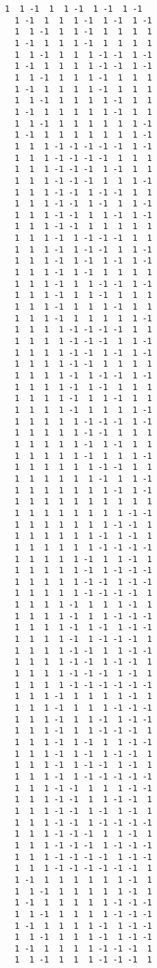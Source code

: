 \documentclass[%
 showpacs,
 showkeys,
 preprintnumbers,
 amsmath,amssymb,
 aps,
  pra,
  longbibliography,
 floatfix,
 ]{revtex4-1}
\begin{document}
{\begin{lstlisting}[backgroundcolor=\color{yellow!10},framerule=0pt,breaklines=true, frame=tb]
  1  1 -1  1  1 -1  1 -1  1 -1
  1 -1  1  1  1 -1  1 -1  1 -1
  1  1 -1  1  1 -1  1  1  1  1
  1 -1  1  1  1 -1  1  1  1  1
  1  1 -1  1  1  1 -1 -1  1 -1
  1 -1  1  1  1  1 -1 -1  1 -1
  1  1 -1  1  1  1 -1  1  1  1
  1 -1  1  1  1  1 -1  1  1  1
  1  1 -1  1  1  1  1 -1  1  1
  1 -1  1  1  1  1  1 -1  1  1
  1  1 -1  1  1  1  1  1  1 -1
  1 -1  1  1  1  1  1  1  1 -1
  1  1  1 -1 -1 -1 -1 -1  1 -1
  1  1  1 -1 -1 -1 -1  1  1  1
  1  1  1 -1 -1 -1  1 -1  1  1
  1  1  1 -1 -1 -1  1  1  1 -1
  1  1  1 -1 -1  1 -1 -1  1  1
  1  1  1 -1 -1  1 -1  1  1 -1
  1  1  1 -1 -1  1  1 -1  1 -1
  1  1  1 -1 -1  1  1  1  1  1
  1  1  1 -1  1 -1 -1 -1  1  1
  1  1  1 -1  1 -1 -1  1  1 -1
  1  1  1 -1  1 -1  1 -1  1 -1
  1  1  1 -1  1 -1  1  1  1  1
  1  1  1 -1  1  1 -1 -1  1 -1
  1  1  1 -1  1  1 -1  1  1  1
  1  1  1 -1  1  1  1 -1  1  1
  1  1  1 -1  1  1  1  1  1 -1
  1  1  1  1 -1 -1 -1 -1  1  1
  1  1  1  1 -1 -1 -1  1  1 -1
  1  1  1  1 -1 -1  1 -1  1 -1
  1  1  1  1 -1 -1  1  1  1  1
  1  1  1  1 -1  1 -1 -1  1 -1
  1  1  1  1 -1  1 -1  1  1  1
  1  1  1  1 -1  1  1 -1  1  1
  1  1  1  1 -1  1  1  1  1 -1
  1  1  1  1  1 -1 -1 -1  1 -1
  1  1  1  1  1 -1 -1  1  1  1
  1  1  1  1  1 -1  1 -1  1  1
  1  1  1  1  1 -1  1  1  1 -1
  1  1  1  1  1  1 -1 -1  1  1
  1  1  1  1  1  1 -1  1  1 -1
  1  1  1  1  1  1  1 -1  1 -1
  1  1  1  1  1  1  1  1  1  1
  1  1  1  1  1  1  1  1 -1 -1
  1  1  1  1  1  1  1 -1 -1  1
  1  1  1  1  1  1 -1  1 -1  1
  1  1  1  1  1  1 -1 -1 -1 -1
  1  1  1  1  1 -1  1  1 -1  1
  1  1  1  1  1 -1  1 -1 -1 -1
  1  1  1  1  1 -1 -1  1 -1 -1
  1  1  1  1  1 -1 -1 -1 -1  1
  1  1  1  1 -1  1  1  1 -1  1
  1  1  1  1 -1  1  1 -1 -1 -1
  1  1  1  1 -1  1 -1  1 -1 -1
  1  1  1  1 -1  1 -1 -1 -1  1
  1  1  1  1 -1 -1  1  1 -1 -1
  1  1  1  1 -1 -1  1 -1 -1  1
  1  1  1  1 -1 -1 -1  1 -1  1
  1  1  1  1 -1 -1 -1 -1 -1 -1
  1  1  1 -1  1  1  1  1 -1  1
  1  1  1 -1  1  1  1 -1 -1 -1
  1  1  1 -1  1  1 -1  1 -1 -1
  1  1  1 -1  1  1 -1 -1 -1  1
  1  1  1 -1  1 -1  1  1 -1 -1
  1  1  1 -1  1 -1  1 -1 -1  1
  1  1  1 -1  1 -1 -1  1 -1  1
  1  1  1 -1  1 -1 -1 -1 -1 -1
  1  1  1 -1 -1  1  1  1 -1 -1
  1  1  1 -1 -1  1  1 -1 -1  1
  1  1  1 -1 -1  1 -1  1 -1  1
  1  1  1 -1 -1  1 -1 -1 -1 -1
  1  1  1 -1 -1 -1  1  1 -1  1
  1  1  1 -1 -1 -1  1 -1 -1 -1
  1  1  1 -1 -1 -1 -1  1 -1 -1
  1  1  1 -1 -1 -1 -1 -1 -1  1
  1 -1  1  1  1  1  1  1 -1  1
  1  1 -1  1  1  1  1  1 -1  1
  1 -1  1  1  1  1  1 -1 -1 -1
  1  1 -1  1  1  1  1 -1 -1 -1
  1 -1  1  1  1  1 -1  1 -1 -1
  1  1 -1  1  1  1 -1  1 -1 -1
  1 -1  1  1  1  1 -1 -1 -1  1
  1  1 -1  1  1  1 -1 -1 -1  1

\end{lstlisting}}
\end{document}

